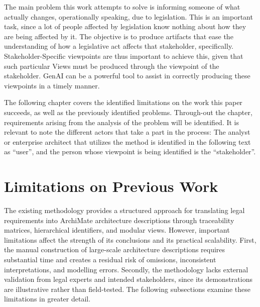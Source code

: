 \label{chap:ProbAnalysis}

The main problem this work attempts to solve is informing someone of what actually changes, operationally speaking, due to legislation. This is an important task, since a lot of people affected by legislation know nothing about how they are being affected by it. The objective is to produce artifacts that ease the understanding of how a legislative act affects that stakeholder, specifically. Stakeholder-Specific viewpoints are thus important to achieve this, given that such particular Views must be produced through the viewpoint of the stakeholder. \ac{GenAI} can be a powerful tool to assist in correctly producing these viewpoints in a timely manner.

The following chapter covers the identified limitations on the work this paper succeeds, as well as the previously identified problems. Through-out the chapter, requirements arising from the analysis of the problem will be identified. It is relevant to note the different actors that take a part in the process: The analyst or enterprise architect that utilizes the method is identified in the following text as ``user'', and the person whose viewpoint is being identified is the ``stakeholder''.

\section{Limitations on Previous Work}

The existing methodology provides a structured approach for translating legal requirements into ArchiMate architecture descriptions through traceability matrices, hierarchical identifiers, and modular views. However, important limitations affect the strength of its conclusions and its practical scalability. First, the manual construction of large-scale architecture descriptions requires substantial time and creates a residual risk of omissions, inconsistent interpretations, and modelling errors. Secondly, the methodology lacks external validation from legal experts and intended stakeholders, since its demonstrations are illustrative rather than field-tested. The following subsections examine these limitations in greater detail.
